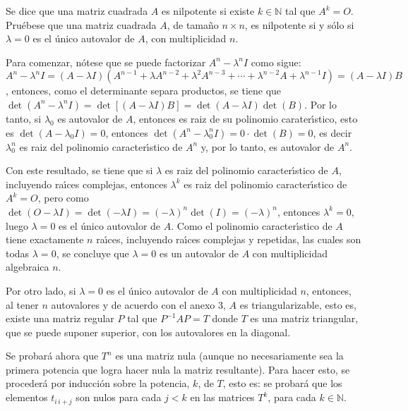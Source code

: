 \begin{enunciado}
 Se dice que una matriz cuadrada $A$ es nilpotente si existe $k \in \mathbb{N}$ tal que $A^k= O$.
 Pru\'ebese que una matriz cuadrada $A$, de tama\~no $n\times n$, es nilpotente si y s\'olo si $\lambda = 0$ es el \'unico autovalor de $A$, con multiplicidad $n$.
\end{enunciado}

\begin{solucion}
 Para comenzar, n\'otese que se puede factorizar $A^n - \lambda^n I$ como sigue: $A^n - \lambda^n I = (A - \lambda I)\left( A^{n-1} + \lambda A^{n-2} + \lambda^2 A^{n-3} + \cdots + \lambda^{n-2} A + \lambda^{n-1} I \right) = (A-\lambda I)B$, entonces, como el determinante separa productos, se tiene que $\det(A^n - \lambda^n I) = \det\left[ (A-\lambda I)B \right] = \det(A - \lambda I)\det(B)$. Por lo tanto, si $\lambda_0$ es autovalor de $A$, entonces es raiz de su polinomio carater\'{\i}stico, esto es $\det(A-\lambda_0 I) = 0$, entonces $\det(A^n - \lambda_0^n I) = 0\cdot \det(B) = 0$, es decir $\lambda_0^n$ es raiz del polinomio caracter\'{\i}stico de $A^n$ y, por lo tanto, es autovalor de $A^n$.
 \par 
 Con este resultado, se tiene que si $\lambda$ es raiz del polinomio caracter\'{\i}stico de $A$, incluyendo ra\'{\i}ces complejas, entonces $\lambda^k$ es raiz del polinomio caracter\'{\i}stico de $A^k = O$, pero como $\det(O - \lambda I) = \det (-\lambda I) = (-\lambda)^n\det(I) = (-\lambda)^n$, entonces $\lambda^k = 0$, luego $\lambda = 0$ es el \'unico autovalor de $A$. Como el polinomio caracter\'{\i}stico de $A$ tiene exactamente $n$ ra\'{\i}ces, incluyendo ra\'{\i}ces complejas y repetidas, las cuales son todas $\lambda = 0$, se concluye que $\lambda = 0$ es un autovalor de $A$ con multiplicidad algebraica $n$.
 \par 
 Por otro lado, si $\lambda = 0$ es el \'unico autovalor de $A$ con multiplicidad $n$, entonces, al tener $n$ autovalores y de acuerdo con el anexo 3, $A$ es triangularizable, esto es, existe una matriz regular $P$ tal que $P^{-1}AP = T$ donde $T$ es una matriz triangular, que se puede suponer superior, con los autovalores en la diagonal.
 \par 
 Se probar\'a ahora que $T^n$ es una matriz nula (aunque no necesariamente sea la primera potencia que logra hacer nula la matriz resultante).
 Para hacer esto, se proceder\'a por inducci\'on sobre la potencia, $k$, de $T$, esto es: se probar\'a que los elementos $t_{i\,i+j}$ son nulos para cada $j<k$ en las matrices $T^k$, para cada $k\in \mathbb{N}$.

\end{solucion}
